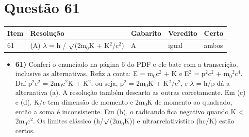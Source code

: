 \documentclass{article}%
\begin{document}
\section*{Questão 61}%
\begin{longtable}{@{}p{} p{} p{} p{} p{}@{}}\toprule Item & Resolução & Gabarito & Veredito & Certo \\ \midrule
61 & (A) $\lambda$ = h / $\surd$(2m$_{0}$K + K$^2$/c$^2$) & A & igual & ambos \\
\bottomrule\end{longtable}%
\begin{itemize}%
\item%
\textbf{61)} Conferi o enunciado na página 6 do PDF e ele bate com a transcrição, inclusive as alternativas. Refiz a conta: E = m$_{0}$c$^2$ + K e E$^2$ = p$^2$c$^2$ + m$_{0}$$^2$c$^{4}$. Daí p$^2$c$^2$ = 2m$_{0}$c$^2$K + K$^2$, ou seja, p$^2$ = 2m$_{0}$K + K$^2$/c$^2$, e $\lambda$ = h/p dá a alternativa (a). A resolução também descarta as outras corretamente. Em (c) e (d), K/c tem dimensão de momento e 2m$_{0}$K de momento ao quadrado, então a soma é inconsistente. Em (b), o radicando fica negativo quando K < 2m$_{0}$c$^2$. Os limites clássico (h/$\surd$(2m$_{0}$K)) e ultrarrelativístico (hc/K) estão certos.%
\end{itemize}%
\end{document}
